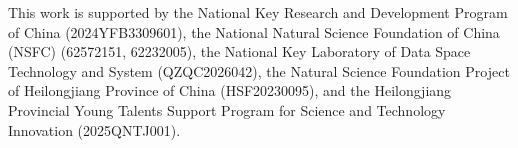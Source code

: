 \documentclass[sigconf, nonacm]{acmart}
\begin{document}
\begin{acks}
This work is supported by the National Key Research and Development Program of China (2024YFB3309601), the National Natural Science Foundation of China (NSFC) (62572151, 62232005), the National Key Laboratory of Data Space Technology and System (QZQC2026042), the Natural Science Foundation Project of Heilongjiang Province of China (HSF20230095), and the Heilongjiang Provincial Young Talents Support Program for Science and Technology Innovation (2025QNTJ001).
\end{acks}



\end{document}
